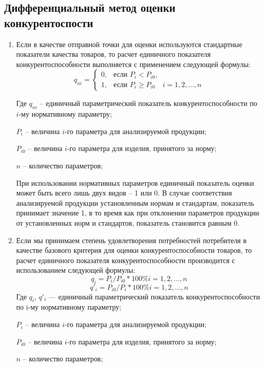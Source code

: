 \documentclass[14pt, a4paper]{extarticle}
\begin{document}
  \subsection{Дифференциальный метод оценки конкурентоспости}
  \begin{enumerate}
    \item Если в качестве отправной точки для оценки используются стандартные показатели качества товаров, то расчет единичного показателя конкурентоспособности выполняется с применением следующей формулы:
    \[
    q_{ni} = 
    \begin{cases} 
    0, & \text{если } P_i < P_{i0}, \\
    1, & \text{если } P_i \geq P_{i0} \quad i = 1, 2, \ldots, n 
    \end{cases}
    \]
    
    Где \( q_{ni} \) -- единичный параметрический показатель конкурентоспособности по \( i \)-му нормативному параметру;

    \( P_i \) -- величина \( i \)-го параметра для анализируемой продукции;

    \( P_{i0} \) -- величина \( i \)-го параметра для изделия, принятого за норму;

    \( n \) -- количество параметров;
    
    При использовании нормативных параметров единичный показатель оценки может быть всего лишь двух видов -- 1 или 0. В случае соответствия анализируемой продукции установленным нормам и стандартам, показатель принимает значение 1, в то время как при отклонении параметров продукции от установленных норм и стандартов, показатель становится равным 0.


    \item Если мы принимаем степень удовлетворения потребностей потребителя в
    качестве базового критерия для оценки конкурентоспособности товаров,
    то расчет единичного показателя конкурентоспособности производится с
    использованием следующей формулы:
    \[
    q_{i} = P_{i}/P_{i0}*100\% i = 1,2, \ldots , n
    \]
    \[
      q'_{i} = P_{i0}/P_{i}*100\% i = 1,2, \ldots , n
    \]
    Где \(q_{i}\), \(q'_{i}\) — единичный параметрический показатель конкурентоспособности по i-му нормативному параметру;
    
    \( P_i \) -- величина \( i \)-го параметра для анализируемой продукции;

    \( P_{i0} \) -- величина \( i \)-го параметра для изделия, принятого за норму;

    \( n \) -- количество параметров;

\end{enumerate}
\end{document}
